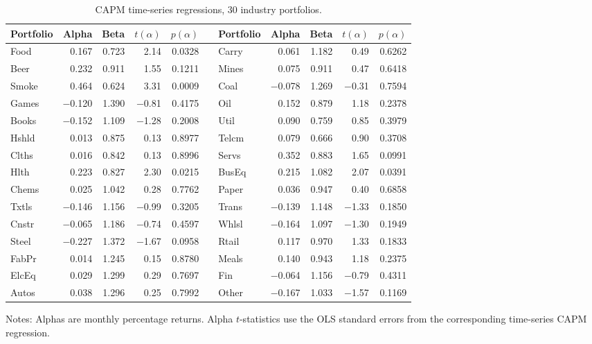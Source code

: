 \documentclass[11pt]{article}
\begin{document}
\begin{table}[H]
\centering
\caption{CAPM time-series regressions, 30 industry portfolios.}
\footnotesize
\setlength{\tabcolsep}{4pt}
\begin{tabular}{lrrrrclrrrr}
\toprule
Portfolio & Alpha & Beta & $t(\alpha)$ & $p(\alpha)$ && Portfolio & Alpha & Beta & $t(\alpha)$ & $p(\alpha)$ \\
\midrule
Food & 0.167 & 0.723 & 2.14 & 0.0328 && Carry & 0.061 & 1.182 & 0.49 & 0.6262 \\
Beer & 0.232 & 0.911 & 1.55 & 0.1211 && Mines & 0.075 & 0.911 & 0.47 & 0.6418 \\
Smoke & 0.464 & 0.624 & 3.31 & 0.0009 && Coal & $-$0.078 & 1.269 & $-$0.31 & 0.7594 \\
Games & $-$0.120 & 1.390 & $-$0.81 & 0.4175 && Oil & 0.152 & 0.879 & 1.18 & 0.2378 \\
Books & $-$0.152 & 1.109 & $-$1.28 & 0.2008 && Util & 0.090 & 0.759 & 0.85 & 0.3979 \\
Hshld & 0.013 & 0.875 & 0.13 & 0.8977 && Telcm & 0.079 & 0.666 & 0.90 & 0.3708 \\
Clths & 0.016 & 0.842 & 0.13 & 0.8996 && Servs & 0.352 & 0.883 & 1.65 & 0.0991 \\
Hlth & 0.223 & 0.827 & 2.30 & 0.0215 && BusEq & 0.215 & 1.082 & 2.07 & 0.0391 \\
Chems & 0.025 & 1.042 & 0.28 & 0.7762 && Paper & 0.036 & 0.947 & 0.40 & 0.6858 \\
Txtls & $-$0.146 & 1.156 & $-$0.99 & 0.3205 && Trans & $-$0.139 & 1.148 & $-$1.33 & 0.1850 \\
Cnstr & $-$0.065 & 1.186 & $-$0.74 & 0.4597 && Whlsl & $-$0.164 & 1.097 & $-$1.30 & 0.1949 \\
Steel & $-$0.227 & 1.372 & $-$1.67 & 0.0958 && Rtail & 0.117 & 0.970 & 1.33 & 0.1833 \\
FabPr & 0.014 & 1.245 & 0.15 & 0.8780 && Meals & 0.140 & 0.943 & 1.18 & 0.2375 \\
ElcEq & 0.029 & 1.299 & 0.29 & 0.7697 && Fin & $-$0.064 & 1.156 & $-$0.79 & 0.4311 \\
Autos & 0.038 & 1.296 & 0.25 & 0.7992 && Other & $-$0.167 & 1.033 & $-$1.57 & 0.1169 \\
\bottomrule
\end{tabular}
\label{tab:p1b_reg}
\vspace{2pt}\begin{minipage}{0.93\textwidth}\footnotesize
Notes: Alphas are monthly percentage returns. Alpha $t$-statistics use the OLS
standard errors from the corresponding time-series CAPM regression.
\end{minipage}
\end{table}
\end{document}
